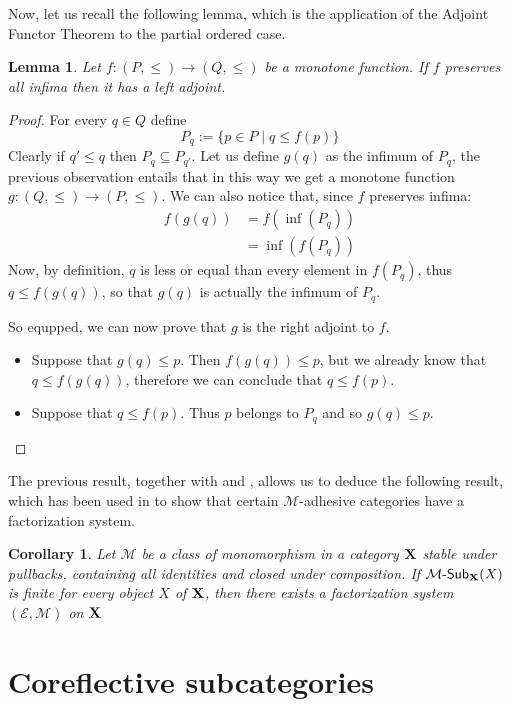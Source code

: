 \documentclass[a4paper]{article}
\newcommand{\sub}[3]{{\mathcal{#1}}\textrm{-}\mathsf{Sub}_{\textbf {\textup{#2}}}(#3)}
\def\X{\textbf {\textup{X}}}
\newtheorem{lemma}[theorem]{Lemma}
\newtheorem{corollary}[theorem]{Corollary}
\theoremstyle{definition}
\begin{document}
Now, let us recall the following lemma, which is the application of the Adjoint Functor Theorem to the partial ordered case.

\begin{lemma}\label{lem:adj}
	Let $f\colon (P,\leq)\to (Q, \leq)$ be a monotone function. If $f$ preserves all infima then it has a left adjoint.
\end{lemma}
\begin{proof}
	For every $q\in Q$ define
	\[P_q:=\{p\in P \mid q \leq f(p)\}\]
Clearly if $q'\leq q$ then $P_{q}\subseteq P_{q'}$. Let us define $g(q)$ as the infimum of $P_q$, the previous observation entails that in this way we get a monotone function $g\colon (Q, \leq)\to (P, \leq)$.
 We can also notice that, since $f$ preserves infima:
\begin{align*}
	f(g(q))&=f(\inf(P_q))\\&=\inf(f(P_q))
\end{align*}
Now, by definition, $q$ is less or equal than every element in $f(P_q)$, thus $q\leq f(g(q))$, so that $g(q)$ is actually the infimum of $P_q$. 
 
 So equpped, we can now prove that $g$ is the right adjoint to $f$.
\begin{itemize}
	\item Suppose that $g(q)\leq p$.  Then $f(g(q))\leq p$, but we already know that $q\leq f(g(q))$, therefore we can conclude that $q\leq f(p)$.
	\item  Suppose that $q\leq f(p)$. Thus $p$ belongs to $P_q$ and so $g(q)\leq p$. \qedhere 
\end{itemize}
\end{proof}

The previous result, together with  and , allows us to deduce the following result, which has been used in \cite{baldan2011lattice,braatz2010finitary} to show that certain $\mathcal{M}$-adhesive categories have a factorization system.

\begin{corollary}\label{cor:fin}
	Let $\mathcal{M}$ be a class of monomorphism in a category $\X$ stable under pullbacks, containing all identities and closed under composition. If $\sub{M}{X}{X}$ is finite for every object $X$ of $\X$, then there exists a factorization system $(\mathcal{E},\mathcal{M})$ on $\X$
\end{corollary}


\section{Coreflective subcategories}
\end{document}
